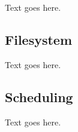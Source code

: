 Text goes here.




\subsection{Filesystem}
\label{subsec:accre--filesystem}


Text goes here.




\subsection{Scheduling}
\label{subsec:accre--scheduling}


Text goes here.




